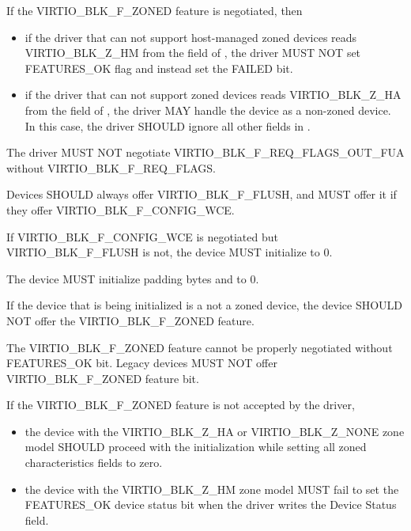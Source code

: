 If the VIRTIO_BLK_F_ZONED feature is negotiated, then
\begin{itemize}
\item if the driver that can not support host-managed zoned devices
    reads VIRTIO_BLK_Z_HM from the  field of , the
    driver MUST NOT set FEATURES_OK flag and instead set the FAILED bit.

\item if the driver that can not support zoned devices reads VIRTIO_BLK_Z_HA
    from the  field of , the driver
    MAY handle the device as a non-zoned device. In this case, the
    driver SHOULD ignore all other fields in .
\end{itemize}

The driver MUST NOT negotiate VIRTIO_BLK_F_REQ_FLAGS_OUT_FUA without
VIRTIO_BLK_F_REQ_FLAGS.


Devices SHOULD always offer VIRTIO_BLK_F_FLUSH, and MUST offer it
if they offer VIRTIO_BLK_F_CONFIG_WCE.

If VIRTIO_BLK_F_CONFIG_WCE is negotiated but VIRTIO_BLK_F_FLUSH
is not, the device MUST initialize  to 0.

The device MUST initialize padding bytes  and
 to 0.

If the device that is being initialized is a not a zoned device, the device
SHOULD NOT offer the VIRTIO_BLK_F_ZONED feature.

The VIRTIO_BLK_F_ZONED feature cannot be properly negotiated without
FEATURES_OK bit. Legacy devices MUST NOT offer VIRTIO_BLK_F_ZONED feature bit.

If the VIRTIO_BLK_F_ZONED feature is not accepted by the driver,
\begin{itemize}
\item the device with the VIRTIO_BLK_Z_HA or VIRTIO_BLK_Z_NONE zone model SHOULD
    proceed with the initialization while setting all zoned characteristics
    fields to zero.

\item the device with the VIRTIO_BLK_Z_HM zone model MUST fail to set the
    FEATURES_OK device status bit when the driver writes the Device Status
    field.
\end{itemize}

